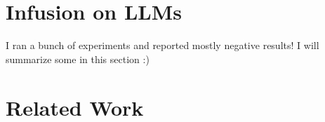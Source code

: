\documentclass{article}
\theoremstyle{plain}
\theoremstyle{definition}
\theoremstyle{remark}
\begin{document}



\section{Infusion on LLMs}

I ran a bunch of experiments and reported mostly negative results! I will summarize some in this section :)



\section{Related Work}
\label{related_work}
\end{document}
